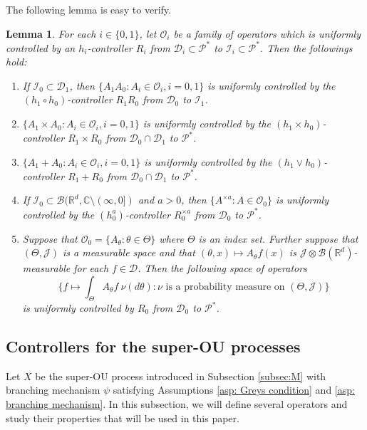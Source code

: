 \documentclass[12pt,a4paper]{amsart}
\theoremstyle{plain}
\newtheorem{lem}[thm]{Lemma}
\theoremstyle{definition}
\numberwithin{equation}{section}
\begin{document}
The following lemma is easy to verify.
\begin{lem}
  \label{lem: property of controllable operators}
  For each $i \in \{0,1\}$, let $\mathscr O_i$ be a family of operators which is  uniformly controlled by an $h_i$-controller $R_i$ from $\mathcal D_i \subset \mathcal P^*$ to $ \mathcal I_i \subset \mathcal P^*$.
  Then the followings hold:
  \begin{enumerate}
  \item
    If $\mathcal I_0 \subset \mathcal D_1$, then $\{A_1A_0: A_i \in \mathscr O_i, i = 0,1\}$ is uniformly controlled by the $(h_1 \circ h_0)$-controller $R_1R_0$ from $\mathcal D_0$ to $\mathcal I_1$.
  \item
    $\{ A_1 \times A_0: A_i \in \mathscr O_i, i = 0,1\}$ is uniformly controlled by the $(h_1\times h_0)$-controller $R_1 \times R_0$ from $\mathcal D_0 \cap \mathcal D_1$ to $\mathcal P^*$.
  \item
    $\{ A_1 + A_0: A_i \in \mathscr O_i, i = 0,1\}$ is uniformly controlled by the $(h_1 \vee h_0)$-controller $R_1 + R_0$ from $\mathcal D_0 \cap \mathcal D_1$ to $\mathcal P^*$.
  \item
    If $\mathcal I_0 \subset \mathcal B(\mathbb R^d, \mathbb C \setminus (\infty, 0])$ and $a>0$, then $\{A^{\times a} : A \in \mathscr O_0\}$ is uniformly controlled by the $(h_0^a)$-controller $R_0^{\times a}$ from $\mathcal D_0$ to $\mathcal P^*$.
  \item
    Suppose that $\mathscr O_0 = \{A_\theta: \theta \in \Theta \}$ where $\Theta$ is an index set.
    Further suppose that $(\Theta, \mathcal J )$ is a measurable space and that $(\theta,x) \mapsto A_\theta f(x)$ is $\mathcal J \otimes \mathcal B(\mathbb R^d)$-measurable for each $f\in \mathcal D$.
    Then the following space of operators
    \[
      \Big\{ f \mapsto \int_{\Theta} A_\theta f~\nu(d\theta) : \nu \text{ is a probability measure on } (\Theta, \mathcal J) \Big\}
    \]
    is uniformly controlled by $R_0$ from $\mathcal D_0$ to $\mathcal P^*$.
  \end{enumerate}
\end{lem}

\subsection{Controllers for the super-OU processes}
\label{sec: h-controller}
Let $X$ be the super-OU process introduced in Subsection \ref{subsec:M} with branching mechanism $\psi$ satisfying
Assumptions \ref{asp: Greys condition} and \ref{asp: branching mechanism}.
In this subsection, we will define several operators and study their properties that will be used in this paper.
\end{document}
